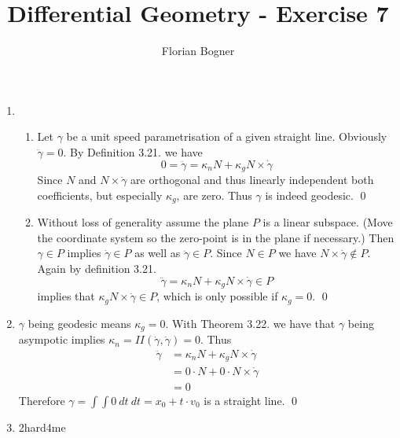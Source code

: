 \documentclass[a4paper,11pt,notitlepage,fullpage]{article}
\begin{document}
\author{Florian Bogner}
\title{Differential Geometry - Exercise 7}
\maketitle


\begin{enumerate}
\item \begin{enumerate}
\item Let $\gamma$ be a unit speed parametrisation of a given straight line. Obviously $\ddot\gamma = 0$. By Definition 3.21. we have
\begin{equation*}
0 = \ddot\gamma = \kappa_n N + \kappa_g N\times\dot\gamma
\end{equation*}
Since $N$ and $N\times\dot\gamma$ are orthogonal and thus linearly independent both coefficients, but especially $\kappa_g$, are zero. Thus $\gamma$ is indeed geodesic. \qed
\item Without loss of generality assume the plane $P$ is a linear subspace. (Move the coordinate system so the zero-point is in the plane if necessary.) Then $\gamma \in P$ implies $\dot\gamma \in P$ as well as $\ddot\gamma \in P$. Since $N\in P$ we have $N\times\dot\gamma \notin P$. Again by definition 3.21.
\begin{equation*}
\ddot\gamma = \kappa_n N + \kappa_g N\times\dot\gamma \in P
\end{equation*}
implies that $\kappa_g N\times\dot\gamma \in P$, which is only possible if $\kappa_g = 0$. \qed
\end{enumerate}

\item $\gamma$ being geodesic means $\kappa_g = 0$. With Theorem 3.22. we have that $\gamma$ being asympotic implies $\kappa_n = II(\dot\gamma, \dot\gamma) = 0$. Thus 
\begin{align*}
\ddot\gamma &= \kappa_n N + \kappa_g N\times\dot\gamma \\
&= 0 \cdot N + 0 \cdot N\times\dot\gamma \\
&= 0
\end{align*}
Therefore $\gamma = \int\int 0 ~dt~dt = x_0 + t\cdot v_0$ is a straight line. \qed

\item 2hard4me


\end{enumerate}
\end{document}
